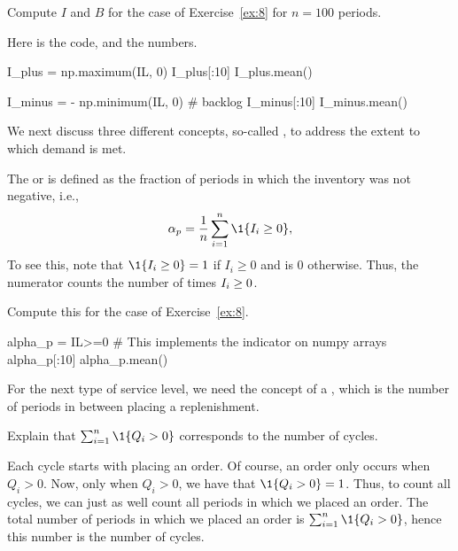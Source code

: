 \begin{exercise}
  Compute $I$ and $B$ for the case of Exercise~\ref{ex:8} for $n=100$ periods.
  \begin{solution}
Here is the code, and the numbers.
\begin{pyconsole}[dynamics]
I_plus = np.maximum(IL, 0)
I_plus[:10]
I_plus.mean()

I_minus = - np.minimum(IL, 0) # backlog
I_minus[:10]
I_minus.mean()
\end{pyconsole}
  \end{solution}
\end{exercise}



We next discuss three different concepts, so-called , to address the extent to which demand is met. 

The  or is defined as the fraction of periods in which the inventory was not negative, i.e., 
\begin{equation}
\alpha_p =   \frac 1n \sum_{i=1}^n \1{\IL_i \geq 0},
\end{equation}
To see this, note that $\1{I_i\geq 0}=1$ if $I_i\geq 0$ and is 0 otherwise. Thus, the numerator counts the number of times $I_i \geq 0$. 

\begin{exercise}
  Compute this for the case of Exercise~\ref{ex:8}.
  \begin{solution}
\begin{pyconsole}[dynamics]
alpha_p = IL>=0 # This implements the indicator on numpy arrays
alpha_p[:10]
alpha_p.mean()
\end{pyconsole}
  \end{solution}
\end{exercise}

For the next type of service level,  we need the concept of a , which is the number of periods in between  placing a replenishment. 

\begin{exercise}
  Explain that $\sum_{i=1}^n \1{Q_i>0}$ corresponds to the number of cycles.
  \begin{solution}
Each cycle starts with placing an order.  Of course, an order only occurs when $Q_i>0$. Now, only when $Q_i>0$, we have that $\1{Q_i>0} = 1$. Thus, to count all cycles, we can just as well count all periods in which we placed an order. The total number of periods in which we placed an order is $\sum_{i=1}^n \1{Q_i>0}$, hence this number is the number of cycles.
  \end{solution}
\end{exercise}

